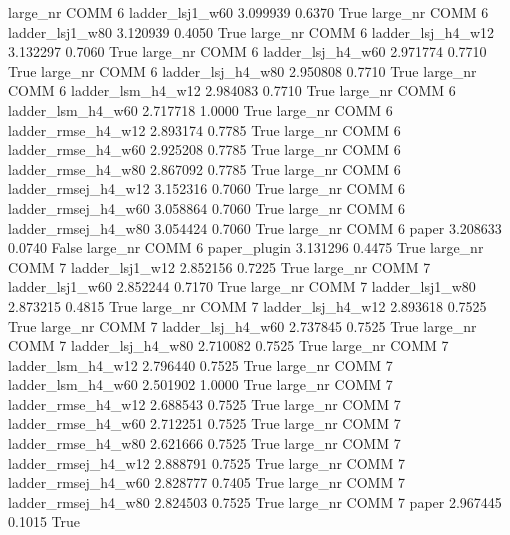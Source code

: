   large_nr     COMM                 6     ladder_lsj1_w60   3.099939      0.6370    True
  large_nr     COMM                 6     ladder_lsj1_w80   3.120939      0.4050    True
  large_nr     COMM                 6   ladder_lsj_h4_w12   3.132297      0.7060    True
  large_nr     COMM                 6   ladder_lsj_h4_w60   2.971774      0.7710    True
  large_nr     COMM                 6   ladder_lsj_h4_w80   2.950808      0.7710    True
  large_nr     COMM                 6   ladder_lsm_h4_w12   2.984083      0.7710    True
  large_nr     COMM                 6   ladder_lsm_h4_w60   2.717718      1.0000    True
  large_nr     COMM                 6  ladder_rmse_h4_w12   2.893174      0.7785    True
  large_nr     COMM                 6  ladder_rmse_h4_w60   2.925208      0.7785    True
  large_nr     COMM                 6  ladder_rmse_h4_w80   2.867092      0.7785    True
  large_nr     COMM                 6 ladder_rmsej_h4_w12   3.152316      0.7060    True
  large_nr     COMM                 6 ladder_rmsej_h4_w60   3.058864      0.7060    True
  large_nr     COMM                 6 ladder_rmsej_h4_w80   3.054424      0.7060    True
  large_nr     COMM                 6               paper   3.208633      0.0740   False
  large_nr     COMM                 6        paper_plugin   3.131296      0.4475    True
  large_nr     COMM                 7     ladder_lsj1_w12   2.852156      0.7225    True
  large_nr     COMM                 7     ladder_lsj1_w60   2.852244      0.7170    True
  large_nr     COMM                 7     ladder_lsj1_w80   2.873215      0.4815    True
  large_nr     COMM                 7   ladder_lsj_h4_w12   2.893618      0.7525    True
  large_nr     COMM                 7   ladder_lsj_h4_w60   2.737845      0.7525    True
  large_nr     COMM                 7   ladder_lsj_h4_w80   2.710082      0.7525    True
  large_nr     COMM                 7   ladder_lsm_h4_w12   2.796440      0.7525    True
  large_nr     COMM                 7   ladder_lsm_h4_w60   2.501902      1.0000    True
  large_nr     COMM                 7  ladder_rmse_h4_w12   2.688543      0.7525    True
  large_nr     COMM                 7  ladder_rmse_h4_w60   2.712251      0.7525    True
  large_nr     COMM                 7  ladder_rmse_h4_w80   2.621666      0.7525    True
  large_nr     COMM                 7 ladder_rmsej_h4_w12   2.888791      0.7525    True
  large_nr     COMM                 7 ladder_rmsej_h4_w60   2.828777      0.7405    True
  large_nr     COMM                 7 ladder_rmsej_h4_w80   2.824503      0.7525    True
  large_nr     COMM                 7               paper   2.967445      0.1015    True
